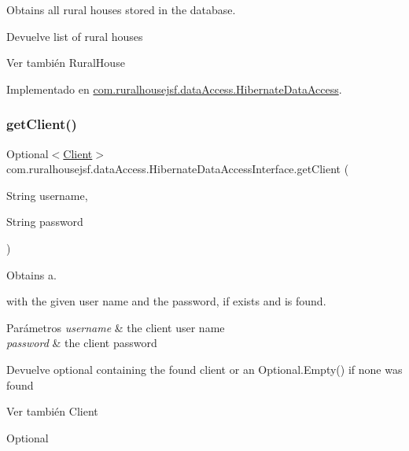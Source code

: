 Obtains all rural houses stored in the database. 

\begin{DoxyReturn}{Devuelve}
list of rural houses
\end{DoxyReturn}
\begin{DoxySeeAlso}{Ver también}
Rural\+House 
\end{DoxySeeAlso}


Implementado en \mbox{\hyperlink{a00144_acb92be47dc680218ff3102addce8ae8f}{com.\+ruralhousejsf.\+data\+Access.\+Hibernate\+Data\+Access}}.

\mbox{\label{a00148_abf581529aefd317dffd1d2ca0906c3ac}} 
\subsubsection{\texorpdfstring{getClient()}{getClient()}}
{\footnotesize\ttfamily Optional$<$\mbox{\hyperlink{a00164}{Client}}$>$ com.\+ruralhousejsf.\+data\+Access.\+Hibernate\+Data\+Access\+Interface.\+get\+Client (\begin{DoxyParamCaption}\item[{String}]{username,  }\item[{String}]{password }\end{DoxyParamCaption})}



Obtains a. 


\begin{DoxyCode}{0}
\end{DoxyCode}
 with the given user name and the password, if exists and is found.


\begin{DoxyParams}{Parámetros}
{\em username} & the client user name \\
\hline
{\em password} & the client password\\
\hline
\end{DoxyParams}
\begin{DoxyReturn}{Devuelve}
optional containing the found client or an {\ttfamily Optional.\+Empty()} if none was found
\end{DoxyReturn}
\begin{DoxySeeAlso}{Ver también}
Client 

Optional 
\end{DoxySeeAlso}


